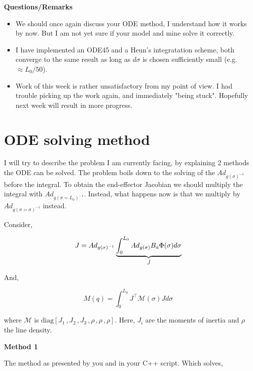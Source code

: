 \textbf{Questions/Remarks}
\begin{itemize}
\item We should once again discuss your ODE method, I understand how it works by now. But I am not yet sure if your model and mine solve it correctly. 
\item I have implemented an ODE45 and a Heun's integratation scheme, both converge to the same result as long as $d\sigma$ is chosen sufficiently small (e.g. $\approx L_0/50$). 
\item Work of this week is rather unsatisfactory from my point of view. I had trouble picking up the work again, and immediately "being stuck". Hopefully next week will result in more progress.
\end{itemize}

\section{ODE solving method}

I will try to describe the problem I am currently facing, by explaining 2 methods the ODE can be solved. The problem boils down to the solving of the $Ad_{g(\sigma)^{-1}}$ before the integral. To obtain the end-effector Jacobian we should multiply the integral with $Ad_{g(\sigma = L_0)^{-1}}$. Instead, what happens now is that we multiply by $Ad_{g(\sigma = \sigma)^{-1}}$ instead.

Consider,

\begin{equation}
    J = Ad_{g(\sigma)^{-1}} \underbrace{\int_0^{L_0} Ad_{g(\sigma)} B_a \Phi(\sigma) d\sigma}_{\Tilde{J}}
\end{equation}

And,

\begin{equation}
    M(q) = \int_0^{L_0} J^\top \mathcal{M}(\sigma) J d \sigma
\end{equation}

where $\mathcal{M}$ is $\text{diag}[J_1\hspace{2pt},J_2\hspace{2pt},J_3\hspace{2pt},\rho\hspace{2pt},\rho \hspace{2pt},\rho]$. Here, $J_i$ are the moments of inertia and $\rho$ the line density.

\clearpage
\textbf{Method 1}

The method as presented by you and in your C++ script. Which solves,

